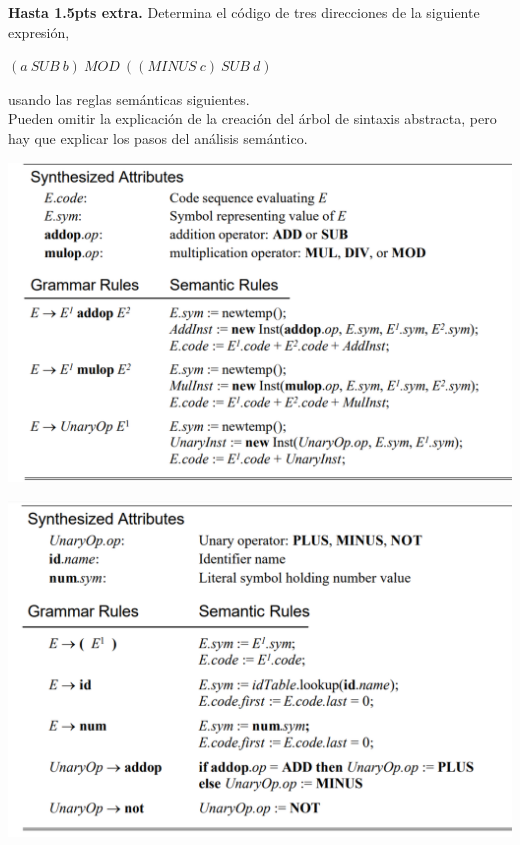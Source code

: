 \textbf{Hasta 1.5pts extra.} Determina el código de tres direcciones
de la siguiente expresión,
\begin{center}
   $(a \ SUB \ b ) \ MOD \ ((MINUS \ c)  \ SUB \ d)$
\end{center}
usando las reglas semánticas siguientes. \\
Pueden omitir la explicación de la creación del árbol de sintaxis abstracta, 
pero hay que explicar los pasos del análisis semántico.

\includegraphics[width=0.7\linewidth]{./Fun_Sem_1.PNG}

\includegraphics[width=0.7\linewidth]{./Funciones_Semanticas_2.PNG}
